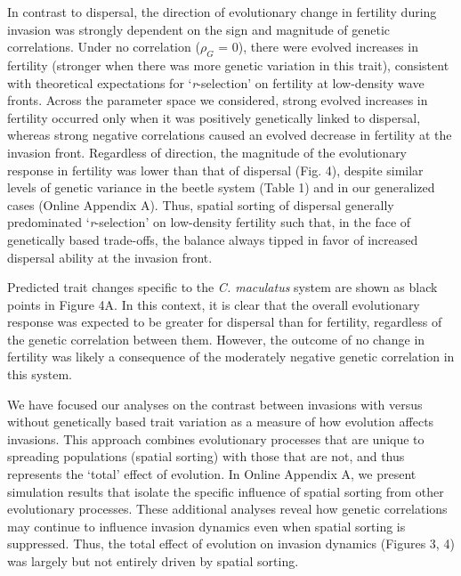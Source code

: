 \documentclass[11pt]{article}
\begin{document}
In contrast to dispersal, the direction of evolutionary change in fertility during invasion was strongly dependent on the sign and magnitude of genetic correlations.
Under no correlation ($\rho_{G}$ = 0), there were evolved increases in fertility (stronger when there was more genetic variation in this trait), consistent with theoretical expectations for `\textit{r}-selection’ on fertility at low-density wave fronts.
Across the parameter space we considered, strong evolved increases in fertility occurred only when it was positively genetically linked to dispersal, whereas strong negative correlations caused an evolved decrease in fertility at the invasion front.
Regardless of direction, the magnitude of the evolutionary response in fertility was lower than that of dispersal (Fig. 4), despite similar levels of genetic variance in the beetle system (Table 1) and in our generalized cases (Online Appendix A).
Thus, spatial sorting of dispersal generally predominated `\textit{r}-selection’ on low-density fertility such that, in the face of genetically based trade-offs, the balance always tipped in favor of increased dispersal ability at the invasion front. 

Predicted trait changes specific to the \textit{C. maculatus} system are shown as black points in Figure 4A. In this context, it is clear that the overall evolutionary response was expected to be greater for dispersal than for fertility, regardless of the genetic correlation between them. However, the outcome of no change in fertility was likely a consequence of the moderately negative genetic correlation in this system.  

We have focused our analyses on the contrast between invasions with versus without genetically based trait variation as a measure of how evolution affects invasions.
This approach combines evolutionary processes that are unique to spreading populations (spatial sorting) with those that are not, and thus represents the `total' effect of evolution.
In Online Appendix A, we present simulation results that isolate the specific influence of spatial sorting from other evolutionary processes. 
These additional analyses reveal how genetic correlations may continue to influence invasion dynamics even when spatial sorting is suppressed.
Thus, the total effect of evolution on invasion dynamics (Figures 3, 4) was largely but not entirely driven by spatial sorting.
\end{document}
